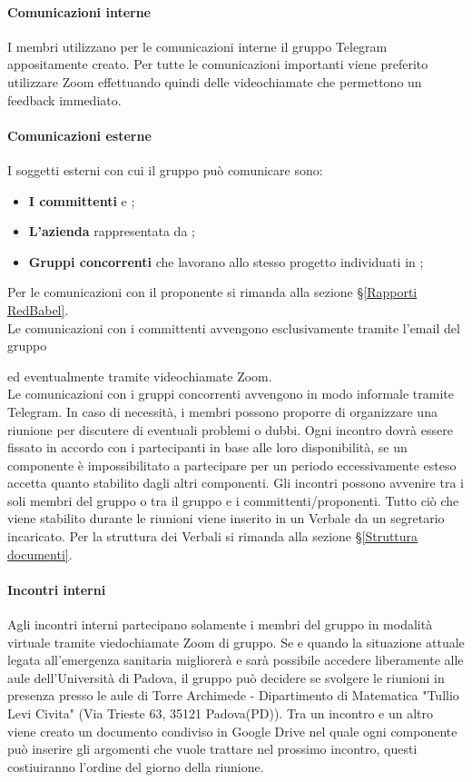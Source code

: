 \paragraph*{Comunicazioni interne}
I membri utilizzano per le comunicazioni interne il gruppo Telegram appositamente creato. Per tutte le comunicazioni importanti viene preferito utilizzare Zoom effettuando quindi delle videochiamate che permettono un feedback immediato.
\paragraph*{Comunicazioni esterne}
I soggetti esterni con cui il gruppo può comunicare sono: 
\begin{itemize}
	\item \textbf{I committenti} \VT e \CR;
	\item \textbf{L'azienda \Proponente} rappresentata da ;
	\item \textbf{Gruppi concorrenti} che lavorano allo stesso progetto \NomeProgetto individuati in ;
\end{itemize}
Per le comunicazioni con il proponente si rimanda alla sezione \S\ref{Rapporti RedBabel}. \\
Le comunicazioni con i committenti avvengono esclusivamente tramite l'email del gruppo
\begin{center}
	 \textbf{\Mail} 
\end{center} ed eventualmente tramite videochiamate Zoom.\\
Le comunicazioni con i gruppi concorrenti avvengono in modo informale tramite Telegram.
In caso di necessità, i membri possono proporre di organizzare una riunione per discutere di eventuali problemi o dubbi. Ogni incontro dovrà essere fissato in accordo con i partecipanti in base alle loro disponibilità, se un componente è impossibilitato a partecipare per un periodo eccessivamente esteso accetta quanto stabilito dagli altri componenti. Gli incontri possono avvenire tra i soli membri del gruppo o tra il gruppo e i committenti/proponenti. 
Tutto ciò che viene stabilito durante le riunioni viene inserito in un Verbale da un segretario incaricato. Per la struttura dei Verbali si rimanda alla sezione \S\ref{Struttura documenti}.
\paragraph*{Incontri interni}
Agli incontri interni partecipano solamente i membri del gruppo in modalità virtuale tramite viedochiamate Zoom di gruppo.
Se e quando la situazione attuale legata all'emergenza sanitaria migliorerà e sarà possibile accedere liberamente alle aule dell'Università di Padova, il gruppo può decidere se svolgere le riunioni in presenza presso le aule di Torre Archimede - Dipartimento di Matematica "Tullio Levi Civita" (Via Trieste 63, 35121 Padova(PD)).
Tra un incontro e un altro viene creato un documento condiviso in Google Drive nel quale ogni componente può inserire gli argomenti che vuole trattare nel prossimo incontro, questi costiuiranno l'ordine del giorno della riunione.
